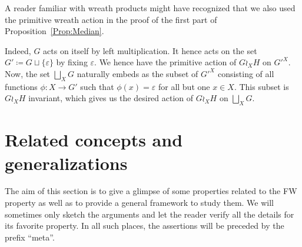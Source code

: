 \begin{rem}\label{Rem:Actionsb}
A reader familiar with wreath products might have recognized that we also used the primitive wreath action in the proof of the first part of Proposition~\ref{Prop:Median}.


Indeed, $G$ acts on itself by left multiplication.
It hence acts on the set $G'\coloneqq G\sqcup\{\varepsilon\}$ by fixing $\varepsilon$.
We hence have the primitive action of $G\wr_{X} H$ on $G'^X$.
Now, the set $\bigsqcup_XG$ naturally embeds as the subset of $G'^X$ consisting of all functions $\phi\colon X\to G'$ such that $\phi(x)=\varepsilon$ for all but one $x\in X$.
This subset is $G\wr_{X} H$ invariant, which gives us the desired action of $G\wr_{X} H$ on $\bigsqcup_XG$.
\end{rem}




\section{Related concepts and generalizations}\label{Section:Generalizations}

The aim of this section is to give a glimpse of some properties related to the FW property as well as to provide a general framework to study them.
We will sometimes only sketch the arguments and let the reader verify all the details for its favorite property.
In all such places, the assertions will be preceded by the prefix ``meta''.

